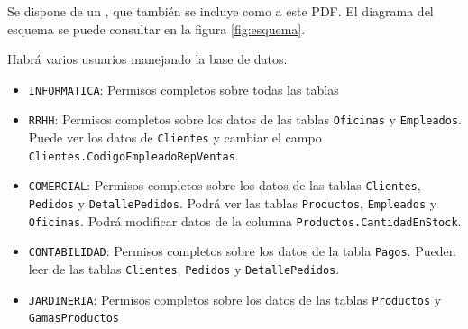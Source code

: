 Se dispone de un , que también se incluye como  a este PDF. El diagrama del esquema se puede consultar en la figura \ref{fig:esquema}.

Habrá varios usuarios manejando la base de datos:
\begin{itemize}
\item \texttt{INFORMATICA}: Permisos completos sobre todas las tablas
\item \texttt{RRHH}: Permisos completos sobre los datos de las tablas \texttt{Oficinas} y \texttt{Empleados}. Puede ver los datos de \texttt{Clientes} y cambiar el campo \texttt{Clientes.CodigoEmpleadoRepVentas}.  
\item \texttt{COMERCIAL}: Permisos completos sobre los datos de las tablas \texttt{Clientes}, \texttt{Pedidos} y \texttt{DetallePedidos}.  Podrá ver las tablas \texttt{Productos}, \texttt{Empleados} y \texttt{Oficinas}. Podrá modificar datos de la columna \texttt{Productos.CantidadEnStock}.
\item \texttt{CONTABILIDAD}: Permisos completos sobre los datos de la tabla \texttt{Pagos}. Pueden leer de las tablas \texttt{Clientes}, \texttt{Pedidos} y \texttt{DetallePedidos}.
\item \texttt{JARDINERIA}: Permisos completos sobre los datos de las tablas \texttt{Productos} y \texttt{GamasProductos}
\end{itemize}

